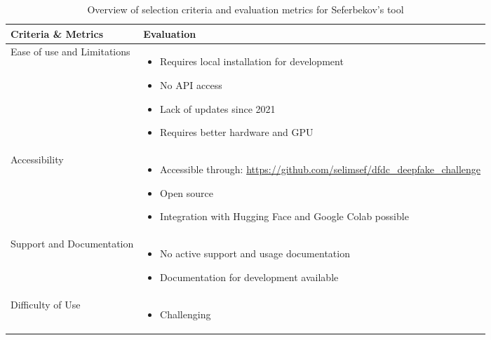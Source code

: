 \begin{table}[htpb]
	\caption{Overview of selection criteria and evaluation metrics for Seferbekov's tool}\label{tab:seferbekov-overview}
	\centering
	\small
	\begin{tabularx}{\textwidth}{l X}
		\toprule
		\textbf{Criteria \& Metrics} & \textbf{Evaluation}                                                                \\
		\midrule
		Ease of use and Limitations  & \begin{itemize}[nosep,nolistsep,noitemsep]
			                               \item Requires local installation for development
			                               \item No \ac{API} access
			                               \item Lack of updates since 2021
			                               \item Requires better hardware and \ac{GPU}
		                               \end{itemize}                                   \\
		Accessibility                & \begin{itemize}[nosep,nolistsep,noitemsep]
			                               \item Accessible through: \url{https://github.com/selimsef/dfdc_deepfake_challenge}
			                               \item Open source
			                               \item Integration with Hugging Face and Google Colab possible
		                               \end{itemize} \\
		Support and Documentation    & \begin{itemize}[nosep,nolistsep,noitemsep]
			                               \item No active support and usage documentation
			                               \item Documentation for development available
		                               \end{itemize}                                     \\
		Difficulty of Use            & \begin{itemize}[nosep,nolistsep,noitemsep]
			                               \item Challenging
		                               \end{itemize}                                          \\

\end{tabularx}
\end{table}
